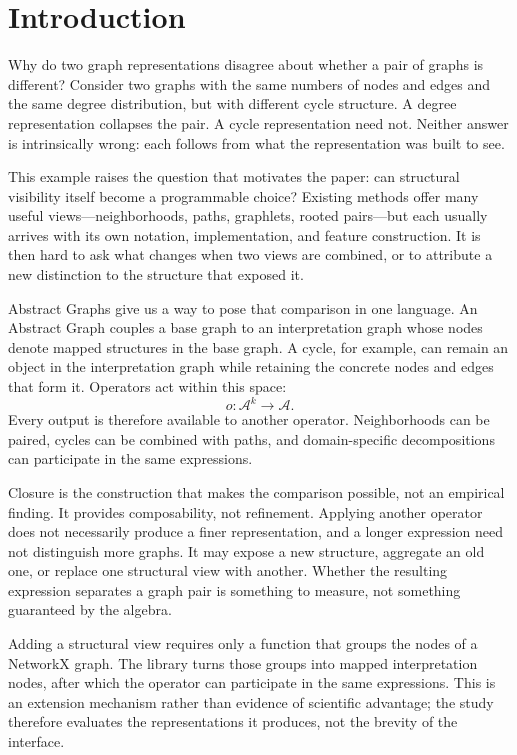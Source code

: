 \section{Introduction}
\label{sec:introduction}

Why do two graph representations disagree about whether a pair of graphs is
different? Consider two graphs with the same numbers of nodes and edges and
the same degree distribution, but with different cycle structure. A degree
representation collapses the pair. A cycle representation need not. Neither
answer is intrinsically wrong: each follows from what the representation was
built to see.

This example raises the question that motivates the paper: can structural
visibility itself become a programmable choice? Existing methods offer many
useful views---neighborhoods, paths, graphlets, rooted pairs---but each usually
arrives with its own notation, implementation, and feature construction. It is
then hard to ask what changes when two views are combined, or to attribute a
new distinction to the structure that exposed it.

Abstract Graphs give us a way to pose that comparison in one language. An
Abstract Graph couples a base graph to an interpretation graph whose nodes
denote mapped structures in the base graph. A cycle, for example, can remain an
object in the interpretation graph while retaining the concrete nodes and
edges that form it. Operators act within this space:
\begin{equation}
  o:\mathcal{A}^{k}\to\mathcal{A}.
\end{equation}
Every output is therefore available to another operator. Neighborhoods can be
paired, cycles can be combined with paths, and domain-specific decompositions
can participate in the same expressions.

Closure is the construction that makes the comparison possible, not an
empirical finding. It provides composability, not refinement. Applying
another operator does not necessarily produce a finer representation, and a
longer expression need not distinguish more graphs. It may expose a new
structure, aggregate an old one, or replace one structural view with another.
Whether the resulting expression separates a graph pair is something to
measure, not something guaranteed by the algebra.

Adding a structural view requires only a function that groups the nodes of a
NetworkX graph. The library turns those groups into mapped interpretation
nodes, after which the operator can participate in the same expressions. This
is an extension mechanism rather than evidence of scientific advantage; the
study therefore evaluates the representations it produces, not the brevity of
the interface.

